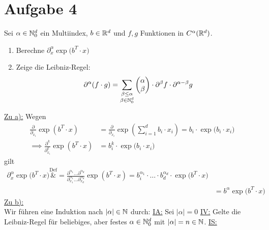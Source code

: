 \documentclass[12pt,a4paper]{article}
\begin{document}
\section*{Aufgabe 4}
Sei $\alpha\in\mathbb{N}_0^d$ ein Multiindex, $b\in\mathbb{R}^d$ und $f,g$ Funktionen in $C^\alpha(\mathbb{R}^d)$.
\begin{enumerate}[label=\alph*)]
\item Berechne $\partial_x^\alpha\exp\big(b^T\cdot x\big)$
\item Zeige die Leibniz-Regel:
\begin{align*}
\partial^\alpha(f\cdot g)=\sum\limits_{\begin{subarray}{c}\beta\leq\alpha\\\beta\in\mathbb{N}_0^d\end{subarray}}\begin{pmatrix}
\alpha\\\beta
\end{pmatrix}\cdot\partial^\beta f\cdot\partial^{\alpha-\beta}g
\end{align*}
\end{enumerate}

\begin{lösung}
\underline{Zu a):}
Wegen
\begin{align*}
\frac{\partial}{\partial_{x_i}}\exp(b^T\cdot x)
&=\frac{\partial}{\partial_{x_i}}\exp\left(\sum\limits_{i=1}^d b_i\cdot x_i\right)
=b_i\cdot\exp\big(b_i\cdot x_i\big)\\
\implies\frac{\partial^k}{\partial_{x_i}^k}\exp(b^T\cdot x)
&=b_i^k\cdot\exp\big(b_i\cdot x_i\big)
\end{align*}
gilt
\begin{align*}
\partial_x^\alpha\exp\big(b^T\cdot x\big)
\overset{\text{Def}}&{=}
\frac{\partial^{\alpha_1}\ldots\partial^{\alpha_d}}{\partial_{x_1}^{\alpha_1}\ldots\partial_{x_d}^{\alpha_d}}\exp(b^T\cdot x)
=b_i^{\alpha_1}\cdot\ldots\cdot b_d^{\alpha_d}\cdot\exp\big(b^T\cdot x\big)\\
&=b^\alpha \exp\big(b^T\cdot x\big)
\end{align*}
\underline{Zu b):}\\
Wir führen eine Induktion nach $|\alpha|\in\mathbb{N}$ durch:\nl
\ul{IA:} Sei $|\alpha|=0$ %
\nl
\ul{IV:} Gelte die Leibniz-Regel für beliebiges, aber festes $\alpha\in\mathbb{N}_0^d$ mit $|\alpha|=n\in\mathbb{N}$.\nl
\ul{IS:}
\end{lösung}
\end{document}
